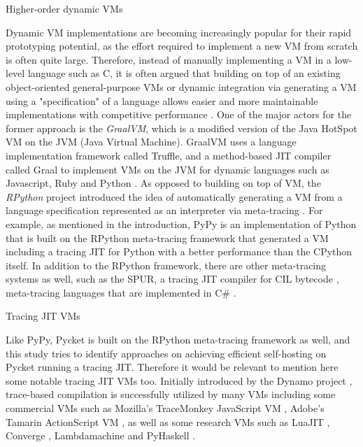         \begin{paragraph-here}%
            Higher-order dynamic VMs

             Dynamic VM implementations are becoming increasingly popular for their
                rapid prototyping potential, as the effort required to implement a new
                VM from scratch is often quite large. Therefore, instead of manually
                implementing a VM in a low-level language such as C, it is often
                argued that building on top of an existing object-oriented
                general-purpose VMs or dynamic integration via generating a VM using a
                "specification" of a language allows easier and more maintainable
                implementations with competitive performance
                \cite{bolzHowNotWrite}. One of the major actors for the former approach
                is the \emph{GraalVM}, which is a modified version of the Java HotSpot
                VM on the JVM (Java Virtual Machine). GraalVM uses a language
                implementation framework called Truffle, and a method-based JIT
                compiler called Graal to implement VMs on the JVM for dynamic
                languages such as Javascript, Ruby and Python \cite{truffle-graal}. As
                opposed to building on top of VM, the \emph{RPython} project
                introduced the idea of automatically generating a VM from a language
                specification represented as an interpreter via meta-tracing
                \cite{rpython07}. For example, as mentioned in the introduction, PyPy
                is an implementation of Python that is built on the RPython
                meta-tracing framework that generated a VM including a tracing JIT for
                Python with a better performance than the CPython itself. In addition
                to the RPython framework, there are other meta-tracing systems as
                well, such as the SPUR, a tracing JIT compiler for CIL bytecode
                \cite{millerCommonLanguageInfrastructure2003}, meta-tracing languages that are implemented
                in C\# \cite{spurJIT}.
        \end{paragraph-here}

        \begin{paragraph-here}%
            Tracing JIT VMs

            Like PyPy, Pycket is built on the RPython meta-tracing framework as
            well, and this study tries to identify approaches on achieving
            efficient self-hosting on Pycket running a tracing JIT. Therefore it
            would be relevant to mention here some notable tracing JIT VMs
            too. Initially introduced by the Dynamo project \cite{dynamo},
            trace-based compilation is successfully utilized by many VMs including
            some commercial VMs such as Mozilla's TraceMonkey JavaScript VM
            \cite{traceMonkey}, Adobe's Tamarin ActionScript VM \cite{tamarin}, as
            well as some research VMs such as LuaJIT \cite{LuaJITLanguageToolkit}, Converge
            \cite{converge:05}, Lambdamachine \cite{lambdamachine} and PyHaskell
            \cite{pyhaskell}.
        \end{paragraph-here}

